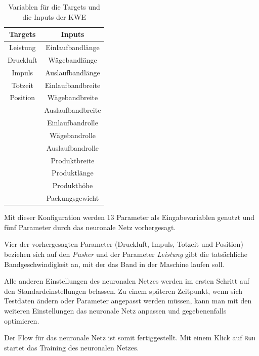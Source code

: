 \begin{table}[h]
    \centering
    \begin{tabular}{|c|c|}
        \hline
        \textbf{Targets} & \textbf{Inputs}\\
        \hline
        \hline
        Leistung & Einlaufbandlänge\\
        \hline
        Druckluft & Wägebandlänge\\
        \hline
        Impuls & Auslaufbandlänge\\
        \hline
        Totzeit & Einlaufbandbreite\\
        \hline
        Position & Wägebandbreite\\
        \hline
        & Auslaufbandbreite\\
        \hline
        & Einlaufbandrolle\\
        \hline
        & Wägebandrolle\\
        \hline
        & Auslaufbandrolle\\
        \hline
        & Produktbreite\\
        \hline
        & Produktlänge\\
        \hline
        & Produkthöhe\\
        \hline
        & Packungsgewicht\\
        \hline
    \end{tabular}
    \caption{Variablen für die Targets und die Inputs der KWE}
    \label{tab:targets_inputs}
\end{table}

Mit dieser Konfiguration werden 13 Parameter als Eingabevariablen genutzt und fünf Parameter durch das neuronale Netz
vorhergesagt.

Vier der vorhergesagten Parameter (Druckluft, Impuls, Totzeit und Position) beziehen sich auf den \textit{Pusher} und
der Parameter \textit{Leistung} gibt die tatsächliche Bandgeschwindigkeit an, mit der das Band in der Maschine laufen
soll.

Alle anderen Einstellungen des neuronalen Netzes werden im ersten Schritt auf den Standardeinstellungen belassen. Zu
einem späteren Zeitpunkt, wenn sich Testdaten ändern oder Parameter angepasst werden müssen, kann man mit den weiteren
Einstellungen das neuronale Netz anpassen und gegebenenfalls optimieren.

Der Flow für das neuronale Netz ist somit fertiggestellt. Mit einem Klick auf \texttt{Run} startet das Training des
neuronalen Netzes.

